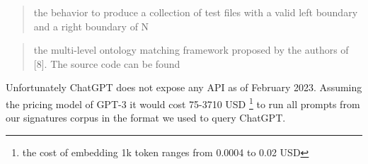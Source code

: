 \documentclass[longabstract,mgr,english]{iithesis}
\begin{document}
\begin{quotation}
the behavior to produce a collection of test files with a valid left boundary and a right boundary of N
\end{quotation}

\begin{quotation}
  the multi-level ontology matching framework proposed by the authors of [8]. The source code can be found
\end{quotation}

Unfortunately ChatGPT does not expose any API as of February 2023. Assuming the
pricing model of GPT-3 it would cost 75-3710 USD \footnote{the cost of embedding
1k token ranges from 0.0004 to 0.02 USD} to run all prompts from our
signatures corpus in the format we used to query ChatGPT.
\end{document}

